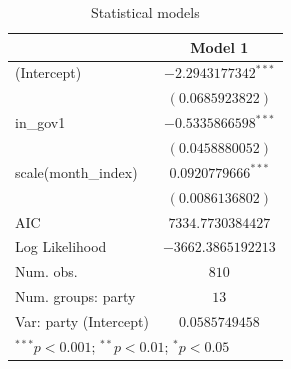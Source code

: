 
\begin{table}
\begin{center}
\begin{tabular}{l c}
\hline
 & Model 1 \\
\hline
(Intercept)            & $-2.2943177342^{***}$ \\
                       & $(0.0685923822)$      \\
in\_gov1               & $-0.5335866598^{***}$ \\
                       & $(0.0458880052)$      \\
scale(month\_index)    & $0.0920779666^{***}$  \\
                       & $(0.0086136802)$      \\
\hline
AIC                    & $7334.7730384427$     \\
Log Likelihood         & $-3662.3865192213$    \\
Num. obs.              & $810$                 \\
Num. groups: party     & $13$                  \\
Var: party (Intercept) & $0.0585749458$        \\
\hline
\multicolumn{2}{l}{\scriptsize{$^{***}p<0.001$; $^{**}p<0.01$; $^{*}p<0.05$}}
\end{tabular}
\caption{Statistical models}
\label{table:coefficients}
\end{center}
\end{table}
